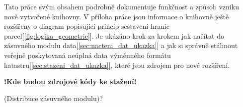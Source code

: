 

Tato práce svým obsahem podrobně dokumentuje funkčnost a způsob vzniku
nově vytvořené knihovny. V příloha práce jsou informace o knihovně
ještě rozšířeny o diagram popisující princip sestavení hranic
parcel[\ref{fig:logika_geometrie}]. Je ukázáno krok za krokem jak
načítat do zásuvného modulu data[\ref{sec:nacteni_dat_ukazka}] a jak
si správně stáhnout veřejně poskytovaná neúplná data výměnného formátu
katastru[\ref{sec:stazeni_dat_ukazka}], které jsou zdrojem pro nové
rozšíření.

\textbf{!Kde budou zdrojové kódy ke stažení!}

(Distribuce zásuvného modulu)?
